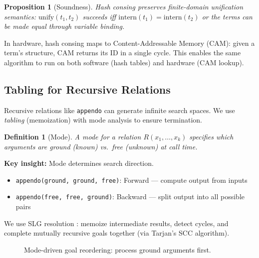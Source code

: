 \documentclass[11pt,a4paper]{article}
\newtheorem{definition}[theorem]{Definition}
\newtheorem{proposition}[theorem]{Proposition}
\begin{document}
\begin{proposition}[Soundness]
Hash consing preserves finite-domain unification semantics: $\text{unify}(t_1, t_2)$ succeeds iff $\text{intern}(t_1) = \text{intern}(t_2)$ or the terms can be made equal through variable binding.
\end{proposition}

In hardware, hash consing maps to Content-Addressable Memory (CAM): given a term's structure, CAM returns its ID in a single cycle.
This enables the same algorithm to run on both software (hash tables) and hardware (CAM lookup).

\subsection{Tabling for Recursive Relations}

Recursive relations like \texttt{appendo} can generate infinite search spaces.
We use \emph{tabling} (memoization) with mode analysis to ensure termination.

\begin{definition}[Mode]
A \emph{mode} for a relation $R(x_1, \ldots, x_k)$ specifies which arguments are ground (known) vs.\ free (unknown) at call time.
\end{definition}

\textbf{Key insight:} Mode determines search direction.
\begin{itemize}
  \item \texttt{appendo(ground, ground, free)}: Forward --- compute output from inputs
  \item \texttt{appendo(free, free, ground)}: Backward --- split output into all possible pairs
\end{itemize}

We use SLG resolution \cite{slg_chirho}: memoize intermediate results, detect cycles, and complete mutually recursive goals together (via Tarjan's SCC algorithm).

\begin{figure}[ht]
\centering
{}
\caption{Mode-driven goal reordering: process ground arguments first.}
\label{fig:tabling}
\end{figure}
\end{document}
